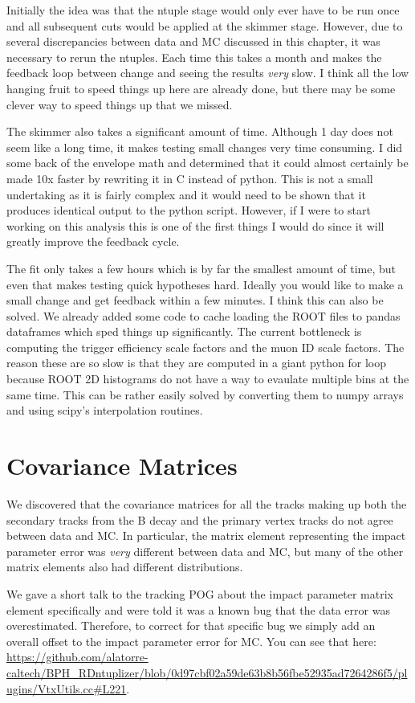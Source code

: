 \documentclass[12pt]{report}
\begin{document}
Initially the idea was that the ntuple stage would only ever have to be run
once and all subsequent cuts would be applied at the skimmer stage. However,
due to several discrepancies between data and MC discussed in this chapter, it
was necessary to rerun the ntuples. Each time this takes a month and makes the
feedback loop between change and seeing the results \emph{very} slow. I think
all the low hanging fruit to speed things up here are already done, but there
may be some clever way to speed things up that we missed.

The skimmer also takes a significant amount of time. Although 1 day does not
seem like a long time, it makes testing small changes very time consuming. I
did some back of the envelope math and determined that it could almost
certainly be made 10x faster by rewriting it in C instead of python. This is
not a small undertaking as it is fairly complex and it would need to be shown
that it produces identical output to the python script. However, if I were to
start working on this analysis this is one of the first things I would do since
it will greatly improve the feedback cycle.

The fit only takes a few hours which is by far the smallest amount of time, but
even that makes testing quick hypotheses hard. Ideally you would like to make a
small change and get feedback within a few minutes. I think this can also be
solved. We already added some code to cache loading the ROOT files to pandas
dataframes which sped things up significantly. The current bottleneck is
computing the trigger efficiency scale factors and the muon ID scale factors.
The reason these are so slow is that they are computed in a giant python for
loop because ROOT 2D histograms do not have a way to evaulate multiple bins at
the same time. This can be rather easily solved by converting them to numpy
arrays and using scipy's interpolation routines.

\section{Covariance Matrices}
We discovered that the covariance matrices for all the tracks making up both
the secondary tracks from the B decay and the primary vertex tracks do not
agree between data and MC. In particular, the matrix element representing the
impact parameter error was \emph{very} different between data and MC, but many
of the other matrix elements also had different distributions.

We gave a short talk to the tracking POG about the impact parameter matrix
element specifically and were told it was a known bug that the data error was
overestimated. Therefore, to correct for that specific bug we simply add an
overall offset to the impact parameter error for MC. You can see that here:
\url{https://github.com/alatorre-caltech/BPH_RDntuplizer/blob/0d97cbf02a59de63b8b56fbe52935ad7264286f5/plugins/VtxUtils.cc#L221}.
\end{document}
